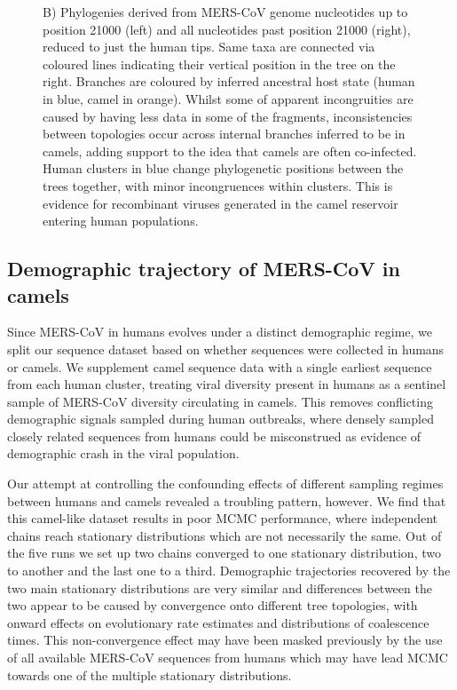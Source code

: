 \documentclass[11pt,oneside,letterpaper]{article}
\def\lmc#1{\textcolor{green}{[#1]}}
\begin{document}
\begin{figure}
{    B) Phylogenies derived from MERS-CoV genome nucleotides up to position 21000 (left) and all nucleotides past position 21000 (right), reduced to just the human tips.
  	Same taxa are connected via coloured lines indicating their vertical position in the tree on the right.
  	Branches are coloured by inferred ancestral host state (human in blue, camel in orange).
  	Whilst some of apparent incongruities are caused by having less data in some of the fragments, inconsistencies between topologies occur across internal branches inferred to be in camels, adding support to the idea that camels are often co-infected.%
  	Human clusters in blue change phylogenetic positions between the trees %
    together, with minor incongruences within clusters.
  	This is evidence for recombinant viruses generated in the camel reservoir%
    entering human populations.
    }%
    \label{recombination}%
\end{figure}

\subsection*{Demographic trajectory of MERS-CoV in camels}
Since MERS-CoV in humans evolves under a distinct demographic regime, we split our sequence dataset based on whether sequences were collected in humans or camels.
We supplement camel sequence data with a single earliest sequence from each human cluster, treating viral diversity present in humans as a sentinel sample of MERS-CoV diversity circulating in camels.
This removes conflicting demographic signals sampled during human outbreaks, where densely sampled closely related sequences from humans could be misconstrued as evidence of demographic crash in the viral population.

Our attempt at controlling the confounding effects of different sampling regimes between humans and camels revealed a troubling pattern, however.
We find that this camel-like dataset results in poor MCMC performance, where independent chains reach stationary distributions which are not necessarily the same.
Out of the five runs we set up two chains converged to one stationary distribution, two to another and the last one to a third.
Demographic trajectories recovered by the two main stationary distributions are very similar and differences between the two appear to be caused by convergence onto different tree topologies, with onward effects on evolutionary rate estimates and distributions of coalescence times.
This non-convergence effect may have been masked previously by the use of all available MERS-CoV sequences from humans which may have lead MCMC towards one of the multiple stationary distributions.
\end{document}
